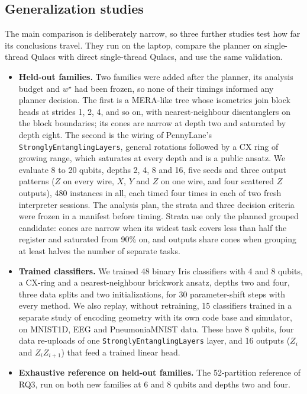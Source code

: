 \subsection{Generalization studies}
\label{sec:generalization}
The main comparison is deliberately narrow, so three further studies test how far its conclusions travel. They run on the laptop, compare the planner on single-thread Qulacs with direct single-thread Qulacs, and use the same validation.
\begin{itemize}
\item \textbf{Held-out families.} Two families were added after the planner, its analysis budget and $w^\star$ had been frozen, so none of their timings informed any planner decision. The first is a MERA-like tree whose isometries join block heads at strides 1, 2, 4, and so on, with nearest-neighbour disentanglers on the block boundaries; its cones are narrow at depth two and saturated by depth eight. The second is the wiring of PennyLane's \texttt{StronglyEntanglingLayers}, general rotations followed by a CX ring of growing range, which saturates at every depth and is a public ansatz. We evaluate 8 to 20 qubits, depths 2, 4, 8 and 16, five seeds and three output patterns ($Z$ on every wire, $X$, $Y$ and $Z$ on one wire, and four scattered $Z$ outputs), 480 instances in all, each timed four times in each of two fresh interpreter sessions. The analysis plan, the strata and three decision criteria were frozen in a manifest before timing. Strata use only the planned grouped candidate: cones are narrow when its widest task covers less than half the register and saturated from 90\% on, and outputs share cones when grouping at least halves the number of separate tasks.
\item \textbf{Trained classifiers.} We trained 48 binary Iris classifiers with 4 and 8 qubits, a CX-ring and a nearest-neighbour brickwork ansatz, depths two and four, three data splits and two initializations, for 30 parameter-shift steps with every method. We also replay, without retraining, 15 classifiers trained in a separate study of encoding geometry with its own code base and simulator, on MNIST1D, EEG and PneumoniaMNIST data. These have 8 qubits, four data re-uploads of one \texttt{StronglyEntanglingLayers} layer, and 16 outputs ($Z_i$ and $Z_iZ_{i+1}$) that feed a trained linear head.
\item \textbf{Exhaustive reference on held-out families.} The 52-partition reference of RQ3, run on both new families at 6 and 8 qubits and depths two and four.
\end{itemize}


